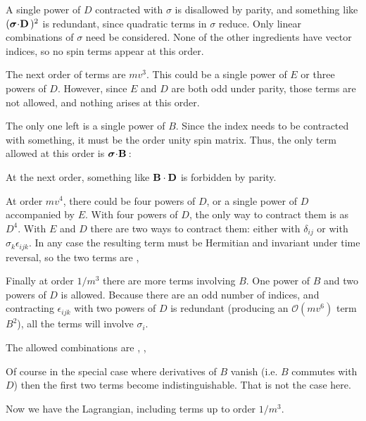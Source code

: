 A single power of $D$ contracted with $\sigma$ is disallowed by parity, and something like $(\mbox{\boldmath$ \sigma $} \hspace{-2pt} \cdot \hspace{-2pt} \mathbf{D} \,)^2$ is redundant, since quadratic terms in $\sigma$ reduce.  Only linear combinations of $\sigma$ need be considered.  None of the other ingredients have vector indices, so no spin terms appear at this order.

The next order of terms are $mv^3$.  This could be a single power of $E$ or three powers of $D$.  However, since $E$ and $D$ are both odd under parity, those terms are not allowed, and nothing arises at this order.



The only one left is a single power of $B$.  Since the index needs to be contracted with something, it must be the order unity spin matrix.  Thus, the only term allowed at this order is $\mbox{\boldmath$ \sigma $} \hspace{-2pt} \cdot \hspace{-2pt} \mathbf{B} \,$:
\beq
\eeq

At the next order, something like $\mathbf{B} \cdot \mathbf{D}$ is forbidden by parity.

At order $mv^4$, there could be four powers of $D$, or a single power of $D$ accompanied by $E$.    With four powers of $D$, the only way to contract them is as $D^4$.  With $E$ and $D$ there are two ways to contract them: either with $\delta_{ij}$ or with $\sigma_k \epsilon_{ijk}$.  In any case the resulting term must be Hermitian and invariant under time reversal, so the two terms are
\beq
	 , \;  
\eeq 


Finally at order $1/m^3$ there are more terms involving $B$.  One power of $B$ and two powers of $D$ is allowed.  Because there are an odd number of indices, and contracting $\epsilon_{ijk}$ with two powers of $D$ is redundant (producing an $\mathcal{O}(mv^6)$ term $B^2$), all the terms will involve $\sigma_i$.

The allowed combinations are
\beq
  ,  \;
			, 	\;
\eeq

Of course in the special case where derivatives of $B$ vanish (i.e. $B$ commutes with $D$) then the first two terms become indistinguishable.  That is not the case here.



Now we have the Lagrangian, including terms up to order $1/m^3$.  

